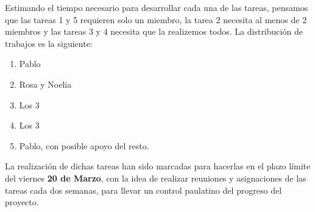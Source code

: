 \documentclass[a4paper,10pt]{article}
\begin{document}
\noindent Estimando el tiempo necesario para desarrollar cada una de
las tareas, pensamos que las tareas 1 y 5 requieren solo un
miembro, la tarea 2 necesita al menos de 2 miembros y las tareas 3 y 4
necesita que la realizemos todos. La distribución de trabajos es
la siguiente:

\begin{enumerate}
\item Pablo
\item Rosa y Noelia
\item Los 3
\item Los 3
\item Pablo, con posible apoyo del resto.
\end{enumerate}

\noindent La realización de dichas tareas han sido marcadas para
hacerlas en el plazo límite del viernes \textbf{20 de Marzo}, con la
idea de realizar reuniones y asignaciones de las tareas cada dos
semanas, para llevar un control paulatino del progreso del proyecto.
\end{document}
